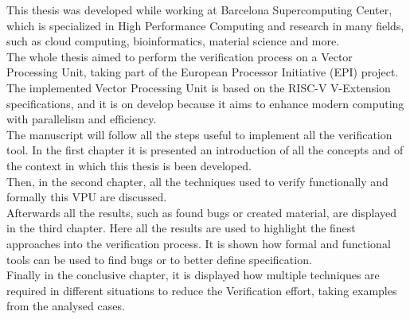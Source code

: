 \summary
\english

This thesis was developed while working at Barcelona Supercomputing Center, which is specialized in High Performance Computing and research in many fields, such as cloud computing, bioinformatics, material science and more.\\


The whole thesis aimed to perform the verification process on a Vector Processing Unit, taking part of the European Processor Initiative (EPI) project.
The implemented Vector Processing Unit is based on the RISC-V V-Extension specifications, and it is on develop because it aims to enhance modern computing with parallelism and efficiency.\\

The manuscript will follow all the steps useful to implement all the verification tool.
In the first chapter it is presented an introduction of all the concepts and of the context in which this thesis is been developed.\\

Then, in the second chapter, all the techniques used to verify functionally and formally this VPU are discussed.\\

Afterwards all the results, such as found bugs or created material, are displayed in the third chapter. Here all the results are used to highlight the finest approaches into the verification process. It is shown how formal and functional tools can be used to find bugs or to better define specification. \\

Finally in the conclusive chapter, it is displayed how multiple techniques are required in different situations to reduce the Verification effort, taking examples from the analysed cases.








\bigskip
